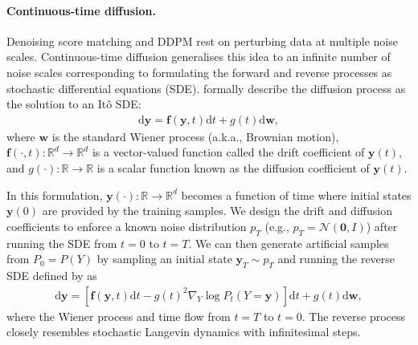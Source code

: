 \paragraph{Continuous-time diffusion.}
Denoising score matching and DDPM rest on perturbing data at multiple noise scales. Continuous-time diffusion generalises this idea to an infinite number of noise scales corresponding to formulating the forward and reverse processes as stochastic differential equations (SDE). \citet{song2020score} formally describe the diffusion process as the solution to an It{\^o} SDE:
\begin{align}
  \text{d}\bm{y} = \bm{f}(\bm{y}, t) \text{d}t + g(t) \text{d}\bm{w}, \label{eq:continuous_diffusion}
\end{align}
where $\bm{w}$ is the standard Wiener process (a.k.a., Brownian motion), $\bm{f}(\cdot, t): \mathbb{R}^d \rightarrow \mathbb{R}^d$ is a vector-valued function called the drift coefficient of $\bm{y}(t)$, and $g(\cdot): \mathbb{R} \rightarrow \mathbb{R}$ is a scalar function known as
the diffusion coefficient of $\bm{y}(t)$.

In this formulation, $\bm{y}(\cdot): \mathbb{R} \rightarrow \mathbb{R}^d$ becomes a function of time where initial states $\bm{y}(0)$ are provided by the training samples. We design the drift and diffusion coefficients to enforce a known noise distribution $p_T$ (e.g., $p_T = \mathcal{N}(\bm 0, I)$) after running the SDE from $t=0$ to $t=T$. We can then generate artificial samples from $P_0 = P(Y)$ by sampling an initial state $\bm{y}_T \sim p_T$ and running the reverse SDE defined by \citet{anderson1982reverse} as
\begin{align}
  \text{d}\bm{y} = \left[ \bm{f}(\bm{y}, t) \text{d}t - g(t)^2 \nabla_Y \log P_t(Y=\bm{y}) \right] \text{d}t + g(t) \text{d}\bm{w},\label{eq:continuous_reverse_diffusion}
\end{align}
where the Wiener process and time flow from $t=T$ to $t=0$. The reverse process closely resembles stochastic Langevin dynamics with infinitesimal steps.

